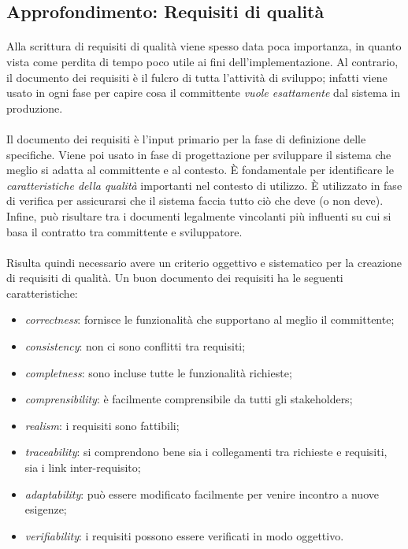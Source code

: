 \documentclass[12pt,a4paper,twoside,english,italian]{book}
\begin{document}
\subsection{Approfondimento: Requisiti di qualità}

\paragraph{} Alla scrittura di requisiti di qualità viene spesso data poca importanza, in quanto vista come perdita di tempo poco utile ai fini dell'implementazione. Al contrario, il documento dei requisiti è il fulcro di tutta l'attività di sviluppo; infatti viene usato in ogni fase per capire cosa il committente \emph{vuole esattamente} dal sistema in produzione. 

\paragraph{} Il documento dei requisiti \cite{req_document} è l'input primario per la fase di definizione delle specifiche. Viene poi usato in fase di progettazione per sviluppare il sistema che meglio si adatta al committente e al contesto. È fondamentale per identificare le \emph{caratteristiche della qualità} importanti nel contesto di utilizzo. È utilizzato in fase di verifica per assicurarsi che il sistema faccia tutto ciò che deve (o non deve). Infine, può risultare tra i documenti legalmente vincolanti più influenti su cui si basa il contratto tra committente e sviluppatore. 

\paragraph{} Risulta quindi necessario avere un criterio oggettivo e sistematico per la creazione di requisiti di qualità. Un buon documento dei requisiti ha le seguenti caratteristiche:
\begin{itemize}
    \item \emph{correctness}: fornisce le funzionalità che supportano al meglio il committente;
    \item \emph{consistency}: non ci sono conflitti tra requisiti;
    \item \emph{completness}: sono incluse tutte le funzionalità richieste;
    \item \emph{comprensibility}: è facilmente comprensibile da tutti gli stakeholders;
    \item \emph{realism}: i requisiti sono fattibili;
    \item \emph{traceability}: si comprendono bene sia i collegamenti tra richieste e requisiti, sia i link inter-requisito;
    \item \emph{adaptability}: può essere modificato facilmente per venire incontro a nuove esigenze;
    \item \emph{verifiability}: i requisiti possono essere verificati in modo oggettivo.
\end{itemize}
\end{document}
